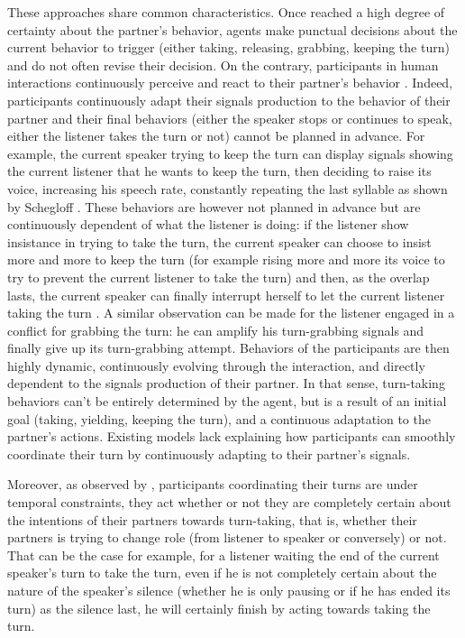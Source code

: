 These approaches share common characteristics. Once reached a high degree of certainty about the partner's behavior, agents make punctual decisions about the current behavior to trigger (either taking, releasing, grabbing, keeping the turn) and do not often revise their decision.
On the contrary, participants in human interactions continuously perceive and react to their partner's behavior \citep{clancy_co-constructed_2015}. Indeed, participants continuously adapt their signals production to the behavior of their partner and their final behaviors (either the speaker stops or continues to speak, either the listener takes the turn or not) cannot be planned in advance. For example, the current speaker trying to keep the turn can display signals showing the current listener that he wants to keep the turn, then deciding to raise its voice, increasing his speech rate, constantly repeating the last syllable as shown by Schegloff \citep{schegloff_overlapping_2000}. These behaviors are however not planned in advance but are continuously dependent of what the listener is doing: if the listener show insistance in trying to take the turn, the current speaker can choose to insist more and more to keep the turn (for example rising more and more its voice to try to prevent the current listener to take the turn) and then, as the overlap lasts, the current speaker can finally interrupt herself to let the current listener taking the turn \citep{schegloff_overlapping_2000}.  
A similar observation can be made for the listener engaged in a conflict for grabbing the turn: he can amplify his turn-grabbing signals and finally give up its turn-grabbing attempt.
 Behaviors of the participants are then highly dynamic, continuously evolving through the interaction, and directly dependent to the signals production of their partner. In that sense, turn-taking behaviors can't be entirely determined by the agent, but is a result of an initial goal (taking, yielding, keeping the turn), and a continuous adaptation to the partner's actions. Existing models lack explaining how participants can smoothly coordinate their turn by continuously adapting to their partner's signals.  
 
Moreover, as observed by \cite{thorisson_natural_2002}, participants coordinating their turns are under temporal constraints, they act whether or not they are completely certain about the intentions of their partners towards turn-taking, that is, whether their partners is trying to change role (from listener to speaker or conversely) or not. That can be the case for example, for a listener waiting the end of the current speaker's turn to take the turn, even if he is not completely certain about the nature of the speaker's silence (whether he is only pausing or if he has ended its turn) as the silence last, he will certainly finish by acting towards taking the turn.
 	
